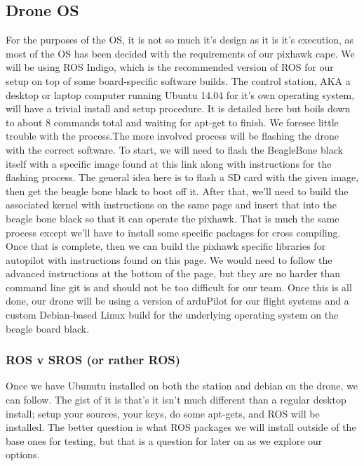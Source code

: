\documentclass[IEEEtran,letterpaper,10pt,notitlepage,draftclsnofoot,onecolumn]{article}
\begin{document}
\subsection{Drone OS}
For the purposes of the OS, it is not so much it's design as it is it's execution, as most of the OS has been decided with
the requirements of our pixhawk cape. We will be using ROS Indigo, which is the recommended version of ROS for our setup on top 
of some board-specific software builds. The control station, AKA a desktop or laptop computer running Ubuntu 14.04 for it's own 
operating system, will have a trivial install and setup procedure. It is detailed here\cite{Indigo} but boils down to about 8 
commands total and waiting for apt-get to finish. We foresee little trouble with the process.The more involved process will be 
flashing the drone with the correct software. To start, we will need to flash the BeagleBone black itself with a specific image 
found at this link along with instructions for the flashing process\cite{buildingBBB}. The general idea here is to flash a SD 
card with the given image, then get the beagle bone black to boot off it. After that, we'll need to build the associated kernel 
with instructions on the same page and insert that into the beagle bone black so that it can operate the pixhawk. That is much 
the same process except we'll have to install some specific packages for cross compiling. Once that is complete, then we can 
build the pixhawk specific libraries for autopilot with instructions found on this page\cite{buildingPX}. We would need to 
follow the advanced instructions at the bottom of the page, but they are no harder than command line git is and should not be 
too difficult for our team. Once this is all done, our drone will be using a version of arduPilot for our flight systems and a 
custom Debian-based Linux build for the underlying operating system on the beagle board black.

\subsubsection{ROS v SROS (or rather ROS)}
Once we have Ubunutu installed on both the station and debian on the drone, we can follow\cite{Indigo}.
The gist of it is that's it isn't much different than a regular desktop install; setup your sources, your keys, do some apt-gets, and ROS will be installed. 
The better question is what ROS packages we will install outside of the base ones for 
testing, but that is a question for later on as we explore our options.
\end{document}
